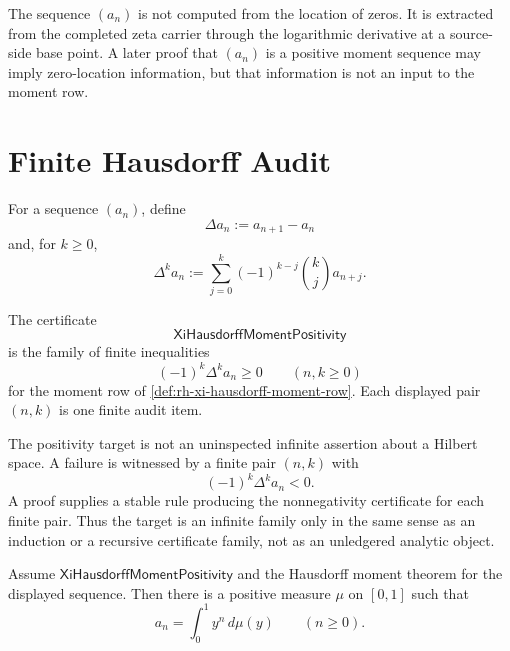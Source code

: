 \begin{principle}
\label{prin:rh-xi-moment-row-source-side}
The sequence $(a_n)$ is not computed from the location of zeros. It is
extracted from the completed zeta carrier through the logarithmic
derivative at a source-side base point. A later proof that $(a_n)$ is a
positive moment sequence may imply zero-location information, but that
information is not an input to the moment row.
\end{principle}

\section{Finite Hausdorff Audit}
\label{sec:rh-xi-hausdorff-finite-audit}

\begin{definition}
\label{def:rh-xi-finite-difference-rows}
For a sequence $(a_n)$, define
$$
\Delta a_n
:=
a_{n+1}-a_n
$$
and, for $k\ge0$,
$$
\Delta^k a_n
:=
\sum_{j=0}^{k}
(-1)^{k-j}
\binom{k}{j}
a_{n+j}.
$$
\end{definition}

\begin{definition}
\label{def:rh-xi-hausdorff-moment-positivity}
The certificate
$$
\mathsf{XiHausdorffMomentPositivity}
$$
is the family of finite inequalities
$$
(-1)^k\Delta^k a_n\ge0
\qquad
(n,k\ge0)
$$
for the moment row of
\autoref{def:rh-xi-hausdorff-moment-row}. Each displayed pair $(n,k)$ is
one finite audit item.
\end{definition}

\begin{principle}
\label{prin:rh-xi-hausdorff-finite-audit-family}
The positivity target is not an uninspected infinite assertion about a
Hilbert space. A failure is witnessed by a finite pair $(n,k)$ with
$$
(-1)^k\Delta^k a_n<0.
$$
A proof supplies a stable rule producing the nonnegativity certificate
for each finite pair. Thus the target is an infinite family only in the
same sense as an induction or a recursive certificate family, not as an
unledgered analytic object.
\end{principle}

\begin{theorem}
\label{thm:rh-xi-hausdorff-positivity-gives-source-measure}
Assume $\mathsf{XiHausdorffMomentPositivity}$ and the Hausdorff moment
theorem for the displayed sequence. Then there is a positive measure
$\mu$ on $[0,1]$ such that
$$
a_n=\int_0^1 y^n\,d\mu(y)
\qquad
(n\ge0).
$$
\end{theorem}

